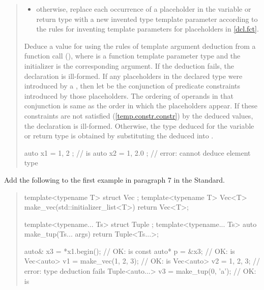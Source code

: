 \begin{quote}
\begin{addedblock}
\begin{itemize}
\item otherwise, replace each occurrence of a placeholder in the
variable or return type with a new invented type template parameter
according to the rules for inventing template parameters
for placeholders in \ref{dcl.fct}. 
\end{itemize}
\end{addedblock}
% 
Deduce a value for   using the rules of template argument deduction from 
a function call (), where  is a function 
template parameter type and the initializer is the corresponding argument.
%
If the deduction fails, the declaration is ill-formed.
% 
If any placeholders in the declared type were introduced by a
, then let  be the
conjunction of predicate constraints introduced by those placeholders.
The ordering of operands in that conjunction is same as the order in which 
the placeholders appear. If these constraints are not satisfied 
(\ref{temp.constr.constr}) by the deduced values, the declaration is 
ill-formed.
% 
Otherwise, the type deduced for the variable or return type is obtained by 
substituting the deduced   into .
% 
\enterexample
\begin{codeblock}
auto x1 = { 1, 2 };    //   is 
auto x2 = { 1, 2.0 };  // error: cannot deduce element type
\end{codeblock}
\exitexample
\end{quote}

Add the following to the first example in paragraph 7 in the \Cpp Standard.

\begin{quote}
\begin{addedblock}
\enterexample
\begin{codeblock}
template<typename T> struct Vec { };
template<typename T> Vec<T> make_vec(std::initializer_list<T>) { return Vec<T>{}; }

template<typename... Ts> struct Tuple { };
template<typename... Ts> auto make_tup(Ts... args) { return Tuple<Ts...>{}; }

auto& x3 = *x1.begin();               // OK:  is 
const auto* p = &x3;                  // OK:  is 
Vec<auto> v1 = make_vec({1, 2, 3});   // OK:  is 
Vec<auto> v2 = {1, 2, 3};             // error: type deduction fails
Tuple<auto...> v3 = make_tup(0, 'a'); // OK:  is 
\end{codeblock}
\exitexample
\end{addedblock}
\end{quote}


